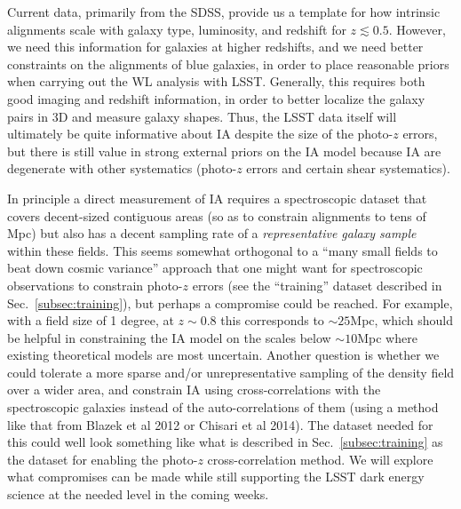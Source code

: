 Current data, primarily from the SDSS, provide us a template for how intrinsic alignments scale with
galaxy type, luminosity, and redshift for $z\lesssim 0.5$.  However, we need this information for
galaxies at higher redshifts, and we need better constraints on the alignments of blue galaxies, in
order to place reasonable priors when carrying out the WL analysis with LSST. Generally, this
requires both good imaging and redshift information, in order to better localize the galaxy pairs in
3D and measure galaxy shapes.  Thus, the LSST data itself will ultimately be quite informative about
IA despite the size of the photo-$z$ errors, but there is still value in strong external priors on
the IA model because IA are degenerate with other systematics (photo-$z$ errors and certain shear
systematics).

In principle a direct measurement of IA requires a spectroscopic dataset that covers decent-sized
contiguous areas (so as to constrain alignments to tens of Mpc) but also has a decent sampling rate
of a {\em representative galaxy sample} within these fields.  This seems somewhat orthogonal to a
``many small fields to beat down cosmic variance'' approach that one might want for spectroscopic
observations to constrain photo-$z$ errors (see the ``training'' dataset described in
Sec.~\ref{subsec:training}), but perhaps a compromise could be reached. For example, with a field
size of 1 degree, at $z\sim 0.8$ this corresponds to $\sim 25$Mpc, which should be helpful in
constraining the IA model on the scales below $\sim 10$Mpc where existing theoretical models are
most uncertain. Another question is whether
we could tolerate a more sparse and/or unrepresentative sampling of the density field over a wider
area, and constrain IA using cross-correlations with the spectroscopic galaxies instead of the
auto-correlations of them (using a method like that from Blazek et al 2012 or Chisari et al 2014).
The dataset needed for this could well look something like what is described in
Sec.~\ref{subsec:training} as the dataset for enabling the photo-$z$ cross-correlation method. We
will explore what compromises can be made while still supporting the LSST dark energy science at the
needed level in the coming weeks.

